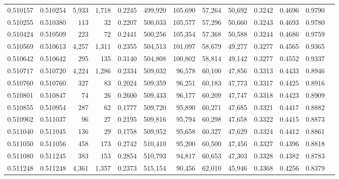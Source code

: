 \begin{tabular}{rrrrrrrrrrrrr}
0.510157 & 0.510254 & 5,933 & 1,718 &                                     0.2245 & 499,920 & 105,690 &  57,264 &  50,692 & 0.3242 & 0.4696 & 0.9790 \\
0.510255 & 0.510380 &   113 &    32 &                                     0.2207 & 500,033 & 105,577 &  57,296 &  50,660 & 0.3243 & 0.4693 & 0.9780 \\
0.510424 & 0.510509 &   223 &    72 &                                     0.2441 & 500,256 & 105,354 &  57,368 &  50,588 & 0.3244 & 0.4686 & 0.9759 \\
0.510569 & 0.510613 & 4,257 & 1,311 &                                     0.2355 & 504,513 & 101,097 &  58,679 &  49,277 & 0.3277 & 0.4565 & 0.9365 \\
0.510642 & 0.510642 &   295 &   135 &                                     0.3140 & 504,808 & 100,802 &  58,814 &  49,142 & 0.3277 & 0.4552 & 0.9337 \\
0.510717 & 0.510720 & 4,224 & 1,286 &                                     0.2334 & 509,032 &  96,578 &  60,100 &  47,856 & 0.3313 & 0.4433 & 0.8946 \\
0.510760 & 0.510760 &   327 &    83 &                                     0.2024 & 509,359 &  96,251 &  60,183 &  47,773 & 0.3317 & 0.4425 & 0.8916 \\
0.510801 & 0.510847 &    74 &    26 &                                     0.2600 & 509,433 &  96,177 &  60,209 &  47,747 & 0.3318 & 0.4423 & 0.8909 \\
0.510855 & 0.510954 &   287 &    62 &                                     0.1777 & 509,720 &  95,890 &  60,271 &  47,685 & 0.3321 & 0.4417 & 0.8882 \\
0.510962 & 0.511037 &    96 &    27 &                                     0.2195 & 509,816 &  95,794 &  60,298 &  47,658 & 0.3322 & 0.4415 & 0.8873 \\
0.511040 & 0.511045 &   136 &    29 &                                     0.1758 & 509,952 &  95,658 &  60,327 &  47,629 & 0.3324 & 0.4412 & 0.8861 \\
0.511050 & 0.511056 &   458 &   173 &                                     0.2742 & 510,410 &  95,200 &  60,500 &  47,456 & 0.3327 & 0.4396 & 0.8818 \\
0.511080 & 0.511245 &   383 &   153 &                                     0.2854 & 510,793 &  94,817 &  60,653 &  47,303 & 0.3328 & 0.4382 & 0.8783 \\
0.511248 & 0.511248 & 4,361 & 1,357 &                                     0.2373 & 515,154 &  90,456 &  62,010 &  45,946 & 0.3368 & 0.4256 & 0.8379 \\

\end{tabular}
